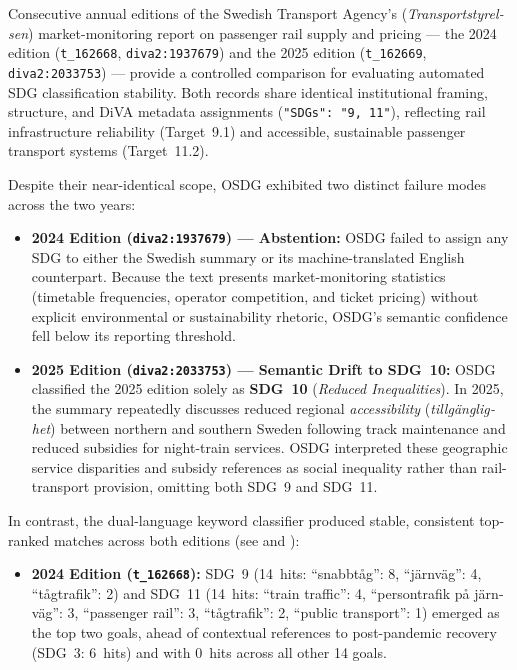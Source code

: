 \begin{casestudySection}
Consecutive annual editions of the Swedish Transport Agency's (\emph{\foreignlanguage{swedish}{Transportstyrelsen}}) market-monitoring report on passenger rail supply and pricing --- the 2024 edition (\texttt{t\_162668}, \texttt{diva2:1937679}) and the 2025 edition (\texttt{t\_162669}, \texttt{diva2:2033753}) --- provide a controlled comparison for evaluating automated \gls{SDG} classification stability. Both records share identical institutional framing, structure, and \gls{DiVA} metadata assignments (\texttt{"SDGs": "9, 11"}), reflecting rail infrastructure reliability (Target~9.1) and accessible, sustainable passenger transport systems (Target~11.2).

Despite their near-identical scope, OSDG exhibited two distinct failure modes across the two years:
\begin{itemize}
  \item \textbf{2024 Edition (\texttt{diva2:1937679}) --- Abstention:} OSDG failed to assign any \gls{SDG} to either the Swedish summary or its machine-translated English counterpart. Because the text presents market-monitoring statistics (timetable frequencies, operator competition, and ticket pricing) without explicit environmental or sustainability rhetoric, OSDG's semantic confidence fell below its reporting threshold.

  \item \textbf{2025 Edition (\texttt{diva2:2033753}) --- Semantic Drift to \gls{SDG}~10:} OSDG classified the 2025 edition solely as \textbf{\gls{SDG}~10} (\emph{Reduced Inequalities}). In 2025, the summary repeatedly discusses reduced regional \emph{accessibility} (\emph{\foreignlanguage{swedish}{tillgänglighet}}) between northern and southern Sweden following track maintenance and reduced subsidies for night-train services. OSDG interpreted these geographic service disparities and subsidy references as social inequality rather than rail-transport provision, omitting both \gls{SDG}~9 and \gls{SDG}~11.
\end{itemize}

In contrast, the dual-language keyword classifier produced stable, consistent top-ranked matches across both editions (see  and ):
\begin{itemize}
  \item \textbf{2024 Edition (\texttt{t\_162668}):} \gls{SDG}~9 (\num{14}~hits: \enquote{\foreignlanguage{swedish}{snabbtåg}}: 8, \enquote{\foreignlanguage{swedish}{järnväg}}: 4, \enquote{\foreignlanguage{swedish}{tågtrafik}}: 2) and \gls{SDG}~11 (\num{14}~hits: \enquote{train traffic}: 4, \enquote{\foreignlanguage{swedish}{persontrafik på järnväg}}: 3, \enquote{passenger rail}: 3, \enquote{\foreignlanguage{swedish}{tågtrafik}}: 2, \enquote{public transport}: 1) emerged as the top two goals, ahead of contextual references to post-pandemic recovery (\gls{SDG}~3: \num{6}~hits) and with \num{0}~hits across all other \num{14} goals.


\end{itemize}
\end{casestudySection}
